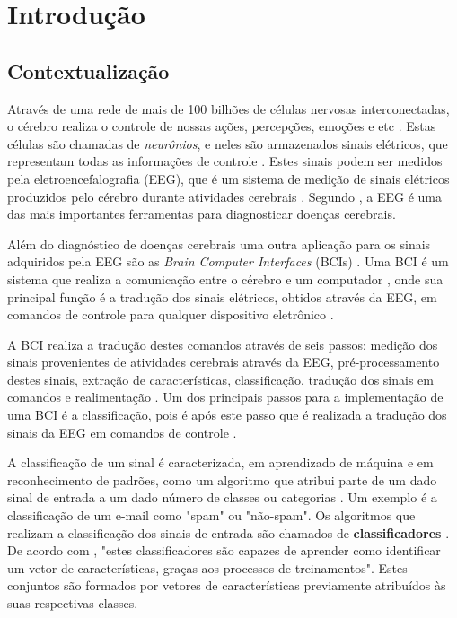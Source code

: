 \chapter[Introdução]{Introdução}

\section{Contextualização}

Através de uma rede de mais de 100 bilhões de células nervosas interconectadas, o cérebro realiza o controle de nossas ações, percepções, emoções e etc \cite{KANDEL}. Estas células são chamadas de \textit{neurônios}, e neles são armazenados sinais elétricos, que representam todas as informações de controle \cite{Siulybook}. Estes sinais podem ser medidos pela eletroencefalografia (EEG), que é um sistema de medição de sinais elétricos produzidos pelo cérebro durante atividades cerebrais \cite{F.Lotte}. Segundo \cite{SIULYDissertacao}, a EEG é uma das mais importantes ferramentas para diagnosticar doenças cerebrais.

Além do diagnóstico de doenças cerebrais uma outra aplicação para os sinais adquiridos pela EEG são as \textit{Brain Computer Interfaces} (BCIs) \cite{F.Lotte}. Uma BCI é um sistema que realiza a comunicação entre o cérebro e um computador \cite{Siulybook}, onde sua principal função é a tradução dos sinais elétricos, obtidos através da EEG, em comandos de controle para qualquer dispositivo eletrônico \cite{Siulybook}.

A BCI realiza a tradução destes comandos através de seis passos: medição dos sinais provenientes de atividades cerebrais através da EEG, pré-processamento destes sinais, extração de características, classificação, tradução dos sinais em comandos e realimentação \cite{MasonAndBirch}. Um dos principais passos para a implementação de uma BCI é a classificação, pois é após este passo que é realizada a tradução dos sinais da EEG em comandos de controle \cite{MasonAndBirch}.

A classificação de um sinal é caracterizada, em aprendizado de máquina e em reconhecimento de padrões, como um algoritmo que atribui parte de um dado sinal de entrada a um dado número de classes ou categorias \cite{brunelli2009template}. Um exemplo é a classificação de um e-mail como "spam" ou "não-spam". Os algoritmos que realizam a classificação dos sinais de entrada são chamados de \textbf{classificadores} \cite{Siulybook}. De acordo com \cite{lottephd}, "estes classificadores são capazes de aprender como identificar um vetor de características, graças aos processos de treinamentos". Estes conjuntos são formados por vetores de características previamente atribuídos às suas respectivas classes.

